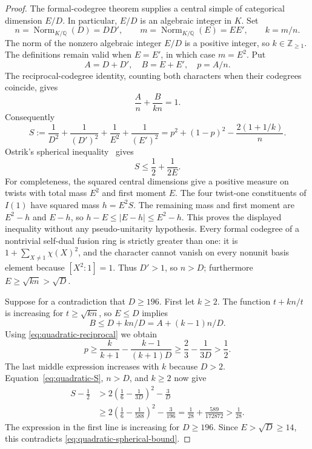 \begin{proof}
The formal-codegree theorem supplies a central simple of categorical
dimension $E/D$. In particular, $E/D$ is an algebraic integer in $K$.
Set
\[
 n=\operatorname{Norm}_{K/\mathbb Q}(D)=DD',\qquad
 m=\operatorname{Norm}_{K/\mathbb Q}(E)=EE',\qquad
 k=m/n.
\]
The norm of the nonzero algebraic integer $E/D$ is a positive integer,
so $k\in\mathbb Z_{\geq1}$. The definitions remain valid when
$E=E'$, in which case $m=E^2$.
Put
\[
 A=D+D',\quad B=E+E',\quad p=A/n.
\]
The reciprocal-codegree identity, counting both characters when their
codegrees coincide, gives
\begin{equation}\label{eq:quadratic-reciprocal}
 \frac An+\frac B{kn}=1.
\end{equation}
Consequently
\begin{equation}\label{eq:quadratic-S}
 S:=\frac1{D^2}+\frac1{(D')^2}+\frac1{E^2}+\frac1{(E')^2}
 =p^2+(1-p)^2-\frac{2(1+1/k)}n.
\end{equation}
Ostrik's spherical inequality~\cite[Theorem~3.1.1]{OstrikGlobal} gives
\begin{equation}\label{eq:quadratic-spherical-bound}
 S\leq\frac12+\frac1{2E}.
\end{equation}
For completeness, the squared central dimensions give a positive
measure on twists with total mass $E^2$ and first moment $E$.
The four twist-one constituents of $I(1)$ have squared mass
$h=E^2S$. The remaining mass and first moment are $E^2-h$ and $E-h$,
so $h-E\leq|E-h|\leq E^2-h$. This proves the displayed inequality
without any pseudo-unitarity hypothesis.
Every formal codegree of a nontrivial self-dual fusion ring is strictly
greater than one: it is $1+\sum_{X\ne1}\chi(X)^2$, and the character
cannot vanish on every nonunit basis element because $[X^2:1]=1$.
Thus $D'>1$, so $n>D$; furthermore $E\geq\sqrt{kn}>\sqrt D$.

Suppose for a contradiction that $D\geq196$. First let $k\geq2$.
The function $t+kn/t$ is increasing for $t\geq\sqrt{kn}$, so
$E\leq D$ implies
\[
 B\leq D+kn/D=A+(k-1)n/D.
\]
Using \eqref{eq:quadratic-reciprocal} we obtain
\[
 p\geq\frac{k}{k+1}-\frac{k-1}{(k+1)D}
       \geq\frac23-\frac1{3D}>\frac12.
\]
The last middle expression increases with $k$ because $D>2$.
Equation~\eqref{eq:quadratic-S}, $n>D$, and $k\geq2$ now give
\begin{align*}
 S-\tfrac12
 &>2\left(\frac16-\frac1{3D}\right)^2-\frac3D\\
 &\geq2\left(\frac16-\frac1{588}\right)^2-\frac3{196}
   =\frac1{28}+\frac{589}{172872}>\frac1{28}.
\end{align*}
The expression in the first line is increasing for $D\geq196$.
Since $E>\sqrt D\geq14$, this contradicts
\eqref{eq:quadratic-spherical-bound}.


\end{proof}
